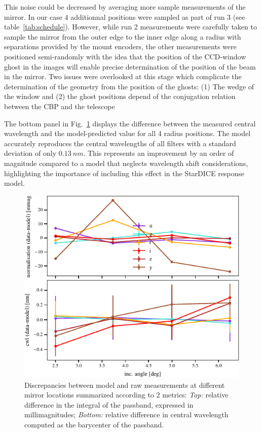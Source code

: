 This noise could be decreased by averaging more sample measurements of
the mirror. In our case 4 additionnal positions were sampled as part
of run 3 (see table~\ref{tab:schedule}). However, while run 2
measurements were carefully taken to sample the mirror from the outer
edge to the inner edge along a radius with separations provided by the
mount encoders, the other measurements were positioned semi-randomly
with the idea that the position of the CCD-window ghost in the images
will enable precise determination of the position of the beam in the
mirror. Two issues were overlooked at this stage which complicate the
determination of the geometry from the position of the ghosts: (1) The
wedge of the window and (2) the ghost positions depend of the
conjugation relation between the CBP and the telescope

The bottom panel in Fig.~\ref{fig:metrics} displays the difference
between the measured central wavelength and the model-predicted value
for all 4 radius positions. The model accurately reproduces the
central wavelengths of all filters with a standard deviation of only
$\SI{0.13}{nm}$. This represents an improvement by an order of
magnitude compared to a model that neglects wavelength shift
considerations, highlighting the importance of including this effect
in the StarDICE response model.

\begin{figure}
  \centering
  \includegraphics[width=1\linewidth]{fig/metrics.pdf}
  \caption{Discrepancies between model and raw measurements at
    different mirror locations summarized according to 2 metrics:
    \emph{Top:} relative difference in the integral of the passband,
    expressed in millimagnitudes; \emph{Bottom:} relative difference
    in central wavelength computed as the barycenter of the passband.}
  \label{fig:metrics}
\end{figure}

